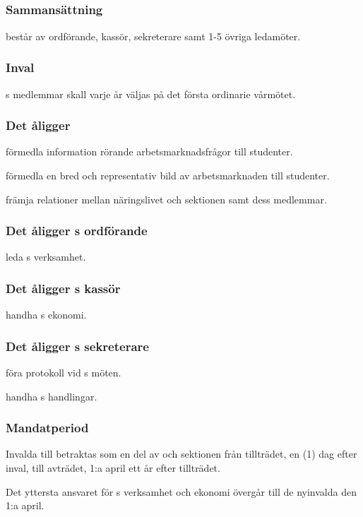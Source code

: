 \subsection{\ARMITFULL{}}
\subsubsection{Sammansättning}
\ARMIT{} består av ordförande, kassör, sekreterare samt 1-5 övriga ledamöter.

\subsubsection{Inval}
\ARMIT{}s medlemmar skall varje år väljas på det första ordinarie vårmötet.

\subsubsection{Det åligger \ARMIT{}}
\begin{att}
	\item förmedla information rörande arbetsmarknadsfrågor till studenter.
	\item förmedla en bred och representativ bild av arbetsmarknaden till studenter.
	\item främja relationer mellan näringslivet och sektionen samt dess medlemmar.
\end{att}

\subsubsection{Det åligger \ARMIT{}s ordförande}
\begin{att}
	\item leda \ARMIT{}s verksamhet.
\end{att}

\subsubsection{Det åligger \ARMIT{}s kassör}
\begin{att}
	\item handha \ARMIT{}s ekonomi.
\end{att}

\subsubsection{Det åligger \ARMIT{}s sekreterare}
\begin{att}
	\item föra protokoll vid \ARMIT{}s möten.
	\item handha \ARMIT{}s handlingar.
\end{att}

\subsubsection{Mandatperiod}
Invalda till \ARMIT{} betraktas som en del av \ARMIT{} och sektionen från tillträdet, en (1) dag efter inval, till avträdet, 1:a april ett år efter tillträdet.

Det yttersta ansvaret för \ARMIT{}s verksamhet och ekonomi övergår till de nyinvalda den 1:a april.
